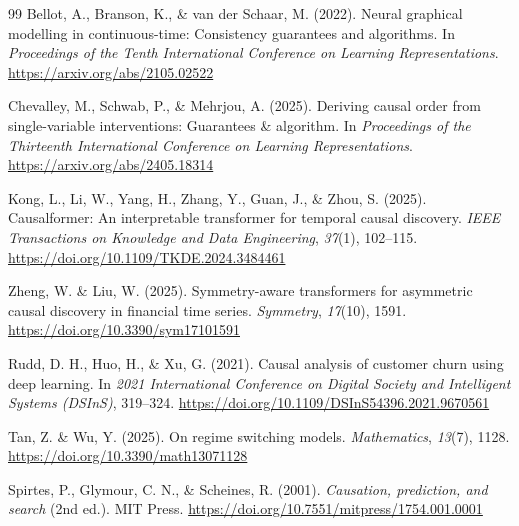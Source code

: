 \begin{thebibliography}{99}
 Bellot, A., Branson, K., \& van der Schaar, M. (2022). Neural graphical modelling in continuous-time: Consistency guarantees and algorithms. In \textit{Proceedings of the Tenth International Conference on Learning Representations}. \url{https://arxiv.org/abs/2105.02522}

 Chevalley, M., Schwab, P., \& Mehrjou, A. (2025). Deriving causal order from single-variable interventions: Guarantees \& algorithm. In \textit{Proceedings of the Thirteenth International Conference on Learning Representations}. \url{https://arxiv.org/abs/2405.18314}

 Kong, L., Li, W., Yang, H., Zhang, Y., Guan, J., \& Zhou, S. (2025). Causalformer: An interpretable transformer for temporal causal discovery. \textit{IEEE Transactions on Knowledge and Data Engineering}, \textit{37}(1), 102--115. \url{https://doi.org/10.1109/TKDE.2024.3484461}

 Zheng, W. \& Liu, W. (2025). Symmetry-aware transformers for asymmetric causal discovery in financial time series. \textit{Symmetry}, \textit{17}(10), 1591. \url{https://doi.org/10.3390/sym17101591}

 Rudd, D. H., Huo, H., \& Xu, G. (2021). Causal analysis of customer churn using deep learning. In \textit{2021 International Conference on Digital Society and Intelligent Systems (DSInS)}, 319--324. \url{https://doi.org/10.1109/DSInS54396.2021.9670561}

 Tan, Z. \& Wu, Y. (2025). On regime switching models. \textit{Mathematics}, \textit{13}(7), 1128. \url{https://doi.org/10.3390/math13071128}

 Spirtes, P., Glymour, C. N., \& Scheines, R. (2001). \textit{Causation, prediction, and search} (2nd ed.). MIT Press. \url{https://doi.org/10.7551/mitpress/1754.001.0001}

\end{thebibliography}
